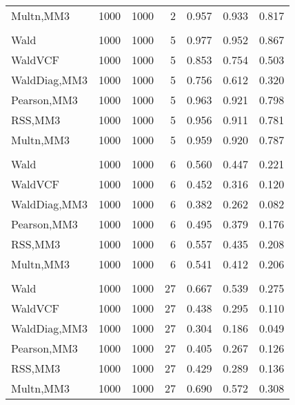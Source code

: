 \documentclass[
]{article}
\begin{document}
\begin{table}[H]
{\begin{tabular}[t]{lrrrrrr}
\hspace{1em}Multn,MM3 & 1000 & 1000 & 2 & 0.957 & 0.933 & 0.817\\
\addlinespace[0.3em]
\multicolumn{7}{l}{\textbf{1F 15V}}\\
\hspace{1em}Wald & 1000 & 1000 & 5 & 0.977 & 0.952 & 0.867\\
\hspace{1em}WaldVCF & 1000 & 1000 & 5 & 0.853 & 0.754 & 0.503\\
\hspace{1em}WaldDiag,MM3 & 1000 & 1000 & 5 & 0.756 & 0.612 & 0.320\\
\hspace{1em}Pearson,MM3 & 1000 & 1000 & 5 & 0.963 & 0.921 & 0.798\\
\hspace{1em}RSS,MM3 & 1000 & 1000 & 5 & 0.956 & 0.911 & 0.781\\
\hspace{1em}Multn,MM3 & 1000 & 1000 & 5 & 0.959 & 0.920 & 0.787\\
\addlinespace[0.3em]
\multicolumn{7}{l}{\textbf{2F 10V}}\\
\hspace{1em}Wald & 1000 & 1000 & 6 & 0.560 & 0.447 & 0.221\\
\hspace{1em}WaldVCF & 1000 & 1000 & 6 & 0.452 & 0.316 & 0.120\\
\hspace{1em}WaldDiag,MM3 & 1000 & 1000 & 6 & 0.382 & 0.262 & 0.082\\
\hspace{1em}Pearson,MM3 & 1000 & 1000 & 6 & 0.495 & 0.379 & 0.176\\
\hspace{1em}RSS,MM3 & 1000 & 1000 & 6 & 0.557 & 0.435 & 0.208\\
\hspace{1em}Multn,MM3 & 1000 & 1000 & 6 & 0.541 & 0.412 & 0.206\\
\addlinespace[0.3em]
\multicolumn{7}{l}{\textbf{3F 15V}}\\
\hspace{1em}Wald & 1000 & 1000 & 27 & 0.667 & 0.539 & 0.275\\
\hspace{1em}WaldVCF & 1000 & 1000 & 27 & 0.438 & 0.295 & 0.110\\
\hspace{1em}WaldDiag,MM3 & 1000 & 1000 & 27 & 0.304 & 0.186 & 0.049\\
\hspace{1em}Pearson,MM3 & 1000 & 1000 & 27 & 0.405 & 0.267 & 0.126\\
\hspace{1em}RSS,MM3 & 1000 & 1000 & 27 & 0.429 & 0.289 & 0.136\\
\hspace{1em}Multn,MM3 & 1000 & 1000 & 27 & 0.690 & 0.572 & 0.308\\
\bottomrule
\end{tabular}}
\endgroup{}
\end{table}
\end{document}
